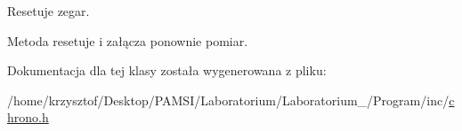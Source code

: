 \-Resetuje zegar. 

\-Metoda resetuje i załącza ponownie pomiar. 

\-Dokumentacja dla tej klasy została wygenerowana z pliku\-:\begin{DoxyCompactItemize}
\item 
/home/krzysztof/\-Desktop/\-P\-A\-M\-S\-I/\-Laboratorium/\-Laboratorium\-\_/\-Program/inc/\hyperlink{chrono_8h}{chrono.\-h}\end{DoxyCompactItemize}
